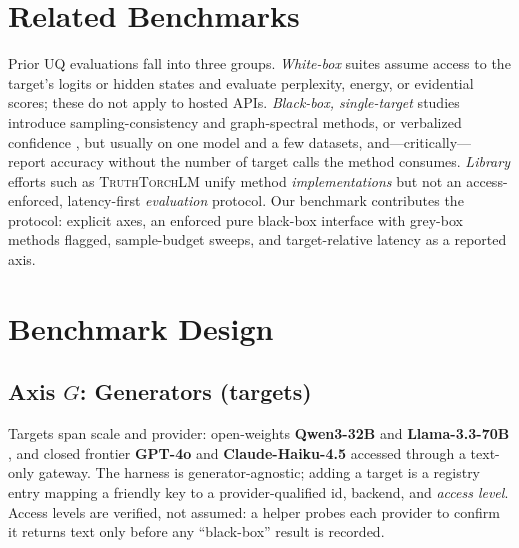 \documentclass[11pt]{article}
\begin{document}
\section{Related Benchmarks}
Prior UQ evaluations fall into three groups. \emph{White-box} suites assume access to
the target's logits or hidden states and evaluate perplexity, energy, or evidential
scores; these do not apply to hosted APIs. \emph{Black-box, single-target} studies
introduce sampling-consistency \citep{kuhn2023semantic,farquhar2024detecting} and
graph-spectral \citep{lin2023generating} methods, or verbalized confidence
\citep{lin2022teaching}, but usually on one model and a few datasets, and---critically---%
report accuracy without the number of target calls the method consumes. \emph{Library}
efforts such as \textsc{TruthTorchLM} \citep{bakman2024truthtorchlm} unify method
\emph{implementations} but not an access-enforced, latency-first \emph{evaluation}
protocol. Our benchmark contributes the protocol: explicit axes, an enforced pure
black-box interface with grey-box methods flagged, sample-budget sweeps, and
target-relative latency as a reported axis.

\section{Benchmark Design}\label{sec:design}
\subsection{Axis $G$: Generators (targets)}
Targets span scale and provider: open-weights \textbf{Qwen3-32B}
\citep{yang2024qwen3} and \textbf{Llama-3.3-70B} \citep{dubey2024llama3}, and closed
frontier \textbf{GPT-4o} and \textbf{Claude-Haiku-4.5} accessed through a text-only
gateway. The harness is generator-agnostic; adding a target is a registry entry mapping a
friendly key to a provider-qualified id, backend, and \emph{access level}. Access levels
are verified, not assumed: a helper probes each provider to confirm it returns text only
before any ``black-box'' result is recorded.
\end{document}
